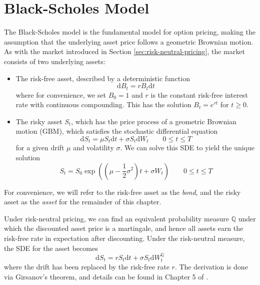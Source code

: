\chapter{Black-Scholes Model}

The Black-Scholes model \cite{black1973pricing} is the fundamental model for option pricing, making the assumption that the underlying asset price follows a geometric Brownian motion. As with the market introduced in Section \ref{sec:risk-neutral-pricing}, the market consists of two underlying assets:
\begin{itemize}
    \item The risk-free asset, described by a deterministic function
    \begin{equation}
        \mathrm d B_t = rB_t \mathrm dt
    \label{eq:bs_risk_free_asset}
    \end{equation}
    where for convenience, we set $B_0 = 1$ and $r$ is the constant risk-free interest rate with continuous compounding. This has the solution $B_t = e^{rt}$ for $t \ge 0$.
    \item The risky asset $S_t$, which has the price process of a geometric Brownian motion (GBM), which satisfies the stochastic differential equation
    \begin{equation}
        \mathrm dS_t = \mu S_t \mathrm dt + \sigma S_t \mathrm dW_t \qquad 0 \le t \le T
    \end{equation}
    for a given drift $\mu$ and volatility $\sigma$. We can solve this SDE to yield the unique solution
    \begin{equation}
        S_t = S_0 \exp \left(\left(\mu - \frac 12 \sigma^2\right) t + \sigma W_t\right)\qquad 0 \le t \le T
    \label{eq:gbm_closed_form}
    \end{equation}
\end{itemize}

For convenience, we will refer to the risk-free asset as the \textit{bond}, and the risky asset as the \textit{asset} for the remainder of this chapter.

Under risk-neutral pricing, we can find an equivalent probability measure $\mathbb Q$ under which the discounted asset price is a martingale, and hence all assets earn the risk-free rate in expectation after discounting. Under the risk-neutral measure, the SDE for the asset becomes
\begin{equation}
    \mathrm dS_t = r S_t \mathrm dt + \sigma S_t \mathrm dW_t^\mathbb Q
\end{equation}
where the drift has been replaced by the risk-free rate $r$. The derivation is done via Girsanov's theorem, and details can be found in Chapter 5 of \cite{shreve2004stochastic}.

